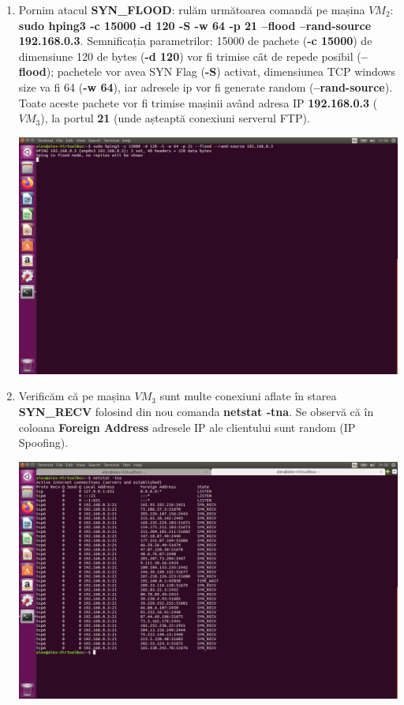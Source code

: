 \documentclass[a4paper]{article}
\begin{document}
\begin{enumerate}
    \item Pornim atacul \textbf{SYN\_FLOOD}: rulăm următoarea comandă pe mașina $ VM_2 $: \textbf{sudo hping3 -c 15000 -d 120 -S -w 64 -p 21 --flood --rand-source 192.168.0.3}. Semnificația parametrilor: 15000 de pachete (\textbf{-c 15000}) de dimensiune 120 de bytes (\textbf{-d 120}) vor fi trimise cât de repede posibil (\textbf{--flood}); pachetele vor avea SYN Flag (\textbf{-S}) activat,  dimensiunea TCP windows size va fi 64 (\textbf{-w 64}), iar adresele ip vor fi generate random (\textbf{--rand-source}). Toate aceste pachete vor fi trimise mașinii având adresa IP \textbf{192.168.0.3} ($ VM_3 $), la portul \textbf{21} (unde așteaptă conexiuni serverul FTP).
    
    \begin{center}
        \hspace*{-1.8cm}                                           \includegraphics[scale=0.56]{"./img/pas3.png"}       
    \end{center}
    
    \item Verificăm că pe mașina $ VM_3 $ sunt multe conexiuni aflate în starea \textbf{SYN\_RECV} folosind din nou comanda \textbf{netstat -tna}. Se observă că în coloana \textbf{Foreign Address} adresele IP ale clientului sunt random (IP Spoofing).
    
    \begin{center}
        \hspace*{-1.8cm}                                           \includegraphics[scale=0.56]{"./img/pas4.png"}       
    \end{center}
    

\end{enumerate}
\end{document}
